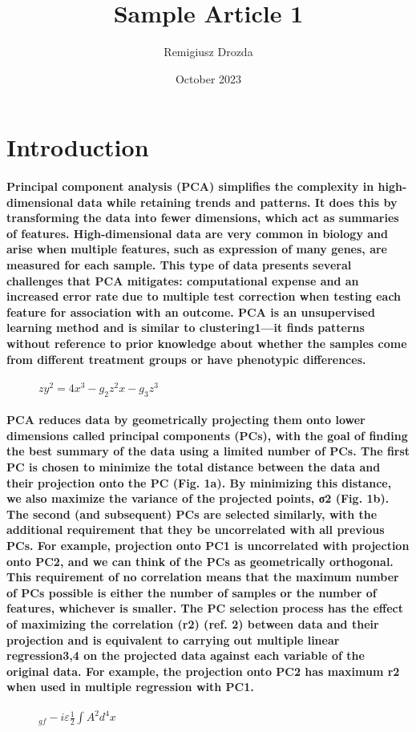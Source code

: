 \documentclass{article}
\title{Sample Article 1}
\author{Remigiusz Drozda}
\date{October 2023}
\begin{document}
\maketitle

\section{Introduction}
\paragraph{Principal component analysis (PCA) simplifies the complexity in high-dimensional data while retaining trends and patterns. It does this by transforming the data into fewer dimensions, which act as summaries of features. High-dimensional data are very common in biology and arise when multiple features, such as expression of many genes, are measured for each sample. This type of data presents several challenges that PCA mitigates: computational expense and an increased error rate due to multiple test correction when testing each feature for association with an outcome. PCA is an unsupervised learning method and is similar to clustering1—it finds patterns without reference to prior knowledge about whether the samples come from different treatment groups or have phenotypic differences.}

\begin{figure}[h]
\centering
    $z y ^ { 2 } = 4 x ^ { 3 } - g _ { 2 } z ^ { 2 } x - g _ { 3 } z ^ { 3 }$
\end{figure}
\paragraph{PCA reduces data by geometrically projecting them onto lower dimensions called principal components (PCs), with the goal of finding the best summary of the data using a limited number of PCs. The first PC is chosen to minimize the total distance between the data and their projection onto the PC (Fig. 1a). By minimizing this distance, we also maximize the variance of the projected points, σ2 (Fig. 1b). The second (and subsequent) PCs are selected similarly, with the additional requirement that they be uncorrelated with all previous PCs. For example, projection onto PC1 is uncorrelated with projection onto PC2, and we can think of the PCs as geometrically orthogonal. This requirement of no correlation means that the maximum number of PCs possible is either the number of samples or the number of features, whichever is smaller. The PC selection process has the effect of maximizing the correlation (r2) (ref. 2) between data and their projection and is equivalent to carrying out multiple linear regression3,4 on the projected data against each variable of the original data. For example, the projection onto PC2 has maximum r2 when used in multiple regression with PC1.}

\begin{figure}[h]
\centering
    $_ { g f } - i \varepsilon \frac { 1 } { 2 } \int A ^ { 2 } d ^ { 4 } x$
\end{figure}
\end{document}
